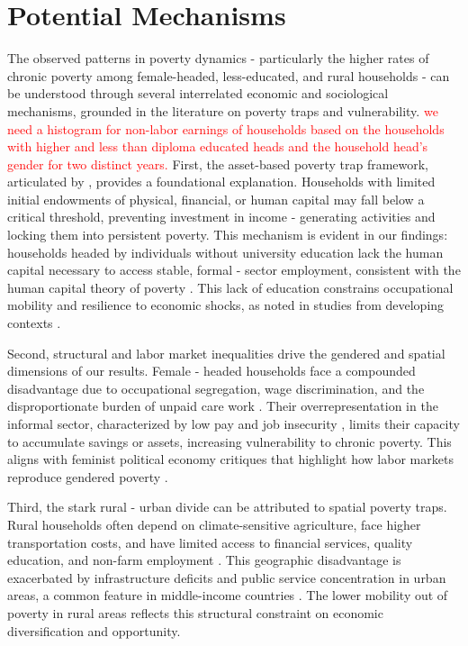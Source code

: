 \documentclass[12pt,a4paper]{article}
\begin{document}
\section{Potential Mechanisms}
The observed patterns in poverty dynamics - particularly the higher rates of chronic poverty among female-headed, less-educated, and rural households - can be understood through several interrelated economic and sociological mechanisms, grounded in the literature on poverty traps and vulnerability.
\textcolor{red}{we need  a histogram for non-labor earnings of households based on the households with higher and less than diploma educated heads and the household head's gender for two distinct years. }
First, the asset-based poverty trap framework, articulated by \citet{barrett2008poverty}, provides a foundational explanation. Households with limited initial endowments of physical, financial, or human capital may fall below a critical threshold, preventing investment in income - generating activities and locking them into persistent poverty. This mechanism is evident in our findings: households headed by individuals without university education lack the human capital necessary to access stable, formal - sector employment, consistent with the human capital theory of poverty \citep{schultz1961investment}. This lack of education constrains occupational mobility and resilience to economic shocks, as noted in studies from developing contexts \citep{behrman1999labor}.

Second, structural and labor market inequalities drive the gendered and spatial dimensions of our results. Female - headed households face a compounded disadvantage due to occupational segregation, wage discrimination, and the disproportionate burden of unpaid care work \citep{worldbank2012world}. Their overrepresentation in the informal sector, characterized by low pay and job insecurity \citep{ilostat2020women}, limits their capacity to accumulate savings or assets, increasing vulnerability to chronic poverty. This aligns with feminist political economy critiques that highlight how labor markets reproduce gendered poverty \citep{elson1999male}.

Third, the stark rural - urban divide can be attributed to spatial poverty traps. Rural households often depend on climate-sensitive agriculture, face higher transportation costs, and have limited access to financial services, quality education, and non-farm employment \citep{jalan2002geographic}. This geographic disadvantage is exacerbated by infrastructure deficits and public service concentration in urban areas, a common feature in middle-income countries \citep{kanbur2014urbanization}. The lower mobility out of poverty in rural areas reflects this structural constraint on economic diversification and opportunity.
\end{document}
